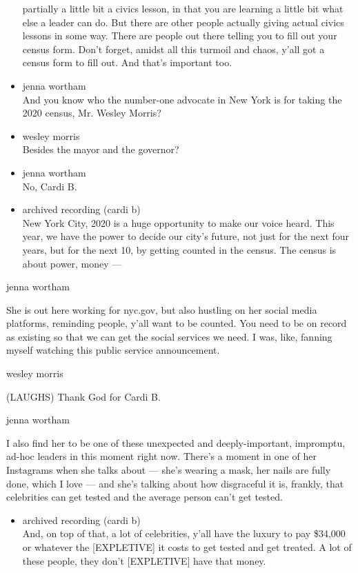\begin{itemize}
  partially a little bit a civics lesson, in that you are learning a
  little bit what else a leader can do. But there are other people
  actually giving actual civics lessons in some way. There are people
  out there telling you to fill out your census form. Don't forget,
  amidst all this turmoil and chaos, y'all got a census form to fill
  out. And that's important too.
\item
  jenna wortham\\
  And you know who the number-one advocate in New York is for taking the
  2020 census, Mr. Wesley Morris?
\item
  wesley morris\\
  Besides the mayor and the governor?
\item
  jenna wortham\\
  No, Cardi B.
\item
  archived recording (cardi b)\\
  New York City, 2020 is a huge opportunity to make our voice heard.
  This year, we have the power to decide our city's future, not just for
  the next four years, but for the next 10, by getting counted in the
  census. The census is about power, money ---
\end{itemize}

jenna wortham

She is out here working for nyc.gov, but also hustling on her social
media platforms, reminding people, y'all want to be counted. You need to
be on record as existing so that we can get the social services we need.
I was, like, fanning myself watching this public service announcement.

wesley morris

(LAUGHS) Thank God for Cardi B.

jenna wortham

I also find her to be one of these unexpected and deeply-important,
impromptu, ad-hoc leaders in this moment right now. There's a moment in
one of her Instagrams when she talks about --- she's wearing a mask, her
nails are fully done, which I love --- and she's talking about how
disgraceful it is, frankly, that celebrities can get tested and the
average person can't get tested.

\begin{itemize}
\tightlist
\item
  archived recording (cardi b)\\
  And, on top of that, a lot of celebrities, y'all have the luxury to
  pay \$34,000 or whatever the {[}EXPLETIVE{]} it costs to get tested
  and get treated. A lot of these people, they don't {[}EXPLETIVE{]}
  have that money.
\end{itemize}

